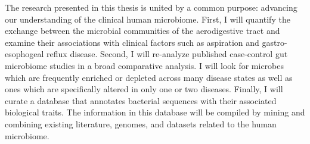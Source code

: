 \documentclass[12pt]{article}
\begin{document}
The research presented in this thesis is united by a common purpose: 
advancing our understanding of the clinical human microbiome.
First, I will quantify the exchange between the microbial communities
of the aerodigestive tract and examine their associations with clinical factors
such as aspiration and gastro-esophogeal reflux disease.
Second, I will re-analyze published case-control gut microbiome studies in a 
broad comparative analysis. 
I will look for microbes which are frequently enriched or depleted
across many disease states as well as ones which are specifically 
altered in only one or two diseases. 
Finally, I will curate a database that annotates bacterial sequences 
with their associated biological traits. The information in this database will
be compiled by mining and combining existing literature, genomes, and datasets
related to the human microbiome.
\end{document}
